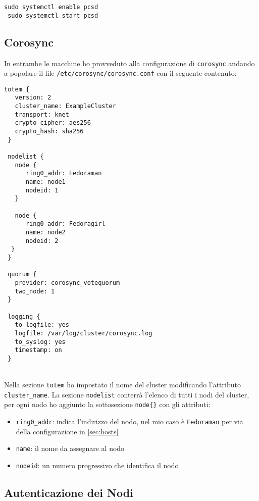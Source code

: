 \begin{lstlisting}[style=cmd]
 sudo systemctl enable pcsd
 sudo systemctl start pcsd
\end{lstlisting}

\subsection{Corosync}

In entrambe le macchine ho provveduto alla configurazione di \lstinline[style=cmd]|corosync| andando a popolare il file \lstinline[style=cmd]|/etc/corosync/corosync.conf| con il seguente contenuto:

\begin{lstlisting}[style=cmd]
 totem {
   version: 2
   cluster_name: ExampleCluster
   transport: knet
   crypto_cipher: aes256
   crypto_hash: sha256
 }

 nodelist {
   node {
      ring0_addr: Fedoraman
      name: node1
      nodeid: 1
   }
	
   node {
      ring0_addr: Fedoragirl
      name: node2
      nodeid: 2
  }
 }

 quorum {
   provider: corosync_votequorum
   two_node: 1
 }

 logging {
   to_logfile: yes
   logfile: /var/log/cluster/corosync.log
   to_syslog: yes
   timestamp: on
 }
\end{lstlisting}
\ \\
Nella sezione \lstinline[style=cmd]|totem| ho impostato il nome del cluster modificando l'attributo \lstinline[style=cmd]|cluster_name|. La sezione \lstinline[style=cmd]|nodelist| conterr\`{a} l'elenco di tutti i nodi del cluster, per ogni nodo ho aggiunto la sottosezione \lstinline[style=cmd]|node{}| con gli attributi:

\begin{itemize}
	\item \lstinline[style=cmd]|ring0_addr|: indica l'indirizzo del nodo, nel mio caso \`{e} \lstinline[style=cmd]|Fedoraman| per via della configurazione in \autoref{sec:hosts}
	\item \lstinline[style=cmd]|name|: il nome da assegnare al nodo
	\item \lstinline[style=cmd]|nodeid|: un numero progressivo che identifica il nodo
\end{itemize}

\subsection{Autenticazione dei Nodi}

